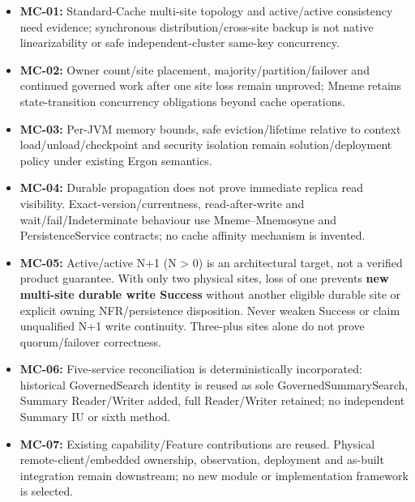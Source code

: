 \begin{itemize}


\item \textbf{MC-01:} Standard-Cache multi-site topology and active/active consistency need evidence; synchronous distribution/cross-site backup is not native linearizability or safe independent-cluster same-key concurrency.

\item \textbf{MC-02:} Owner count/site placement, majority/partition/failover and continued governed work after one site loss remain unproved; Mneme retains state-transition concurrency obligations beyond cache operations.

\item \textbf{MC-03:} Per-JVM memory bounds, safe eviction/lifetime relative to context load/unload/checkpoint and security isolation remain solution/deployment policy under existing Ergon semantics.

\item \textbf{MC-04:} Durable propagation does not prove immediate replica read visibility. Exact-version/currentness, read-after-write and wait/fail/Indeterminate behaviour use Mneme–Mnemosyne and PersistenceService contracts; no cache affinity mechanism is invented.

\item \textbf{MC-05:} Active/active N+1 (N > 0) is an architectural target, not a verified product guarantee. With only two physical sites, loss of one prevents \textbf{new multi-site durable write Success} without another eligible durable site or explicit owning NFR/persistence disposition. Never weaken Success or claim unqualified N+1 write continuity. Three-plus sites alone do not prove quorum/failover correctness.

\item \textbf{MC-06:} Five-service reconciliation is deterministically incorporated: historical GovernedSearch identity is reused as sole GovernedSummarySearch, Summary Reader/Writer added, full Reader/Writer retained; no independent Summary IU or sixth method.

\item \textbf{MC-07:} Existing capability/Feature contributions are reused. Physical remote-client/embedded ownership, observation, deployment and as-built integration remain downstream; no new module or implementation framework is selected.

\end{itemize}



